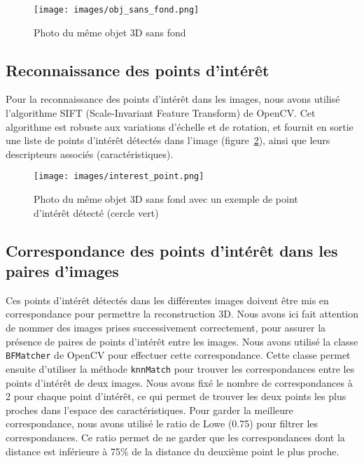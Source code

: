 \documentclass[12pt]{article}
\begin{document}
\begin{figure}[H]
\centering
\texttt{[image: images/obj\_sans\_fond.png]}
\caption{Photo du même objet 3D sans fond}
\label{fig:obj_sans_fond}
\end{figure}

\subsection{Reconnaissance des points d'intérêt}

Pour la reconnaissance des points d'intérêt dans les images, nous avons utilisé l'algorithme SIFT (Scale-Invariant Feature Transform) de OpenCV.
Cet algorithme est robuste aux variations d'échelle et de rotation, et fournit en sortie une liste de points d'intérêt détectés dans l'image (figure~\ref{fig:interest}), ainsi que leurs descripteurs associés (caractéristiques).

\begin{figure}[H]
\centering
\texttt{[image: images/interest\_point.png]}
\caption{Photo du même objet 3D sans fond avec un exemple de point d'intérêt détecté (cercle vert)}
\label{fig:interest}
\end{figure}

\subsection{Correspondance des points d'intérêt dans les paires d'images}

Ces points d'intérêt détectés dans les différentes images doivent être mis en correspondance pour permettre la reconstruction 3D. Nous avons ici fait attention de nommer des images prises successivement correctement, pour assurer la présence de paires de points d'intérêt entre les images.
\linebreak
Nous avons utilisé la classe \texttt{BFMatcher} de OpenCV pour effectuer cette correspondance.
Cette classe permet ensuite d'utiliser la méthode \texttt{knnMatch} pour trouver les correspondances entre les points d'intérêt de deux images.
\linebreak
Nous avons fixé le nombre de correspondances à 2 pour chaque point d'intérêt, ce qui permet de trouver les deux points les plus proches dans l'espace des caractéristiques.
Pour garder la meilleure correspondance, nous avons utilisé le ratio de Lowe (0.75) pour filtrer les correspondances.
Ce ratio permet de ne garder que les correspondances dont la distance est inférieure à 75\% de la distance du deuxième point le plus proche.
\end{document}
